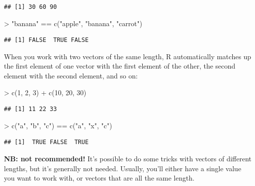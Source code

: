 \documentclass[
]{book}
\newenvironment{Shaded}{\begin{snugshade}}{\end{snugshade}}
\newcommand{\DecValTok}[1]{\textcolor[rgb]{0.00,0.00,0.81}{#1}}
\newcommand{\FunctionTok}[1]{\textcolor[rgb]{0.00,0.00,0.00}{#1}}
\newcommand{\NormalTok}[1]{#1}
\newcommand{\SpecialCharTok}[1]{\textcolor[rgb]{0.00,0.00,0.00}{#1}}
\newcommand{\StringTok}[1]{\textcolor[rgb]{0.31,0.60,0.02}{#1}}
\begin{document}
\begin{verbatim}
## [1] 30 60 90
\end{verbatim}

\begin{Shaded}
\begin{Highlighting}[]
\SpecialCharTok{\textgreater{}} \StringTok{"banana"} \SpecialCharTok{==} \FunctionTok{c}\NormalTok{(}\StringTok{"apple"}\NormalTok{, }\StringTok{"banana"}\NormalTok{, }\StringTok{"carrot"}\NormalTok{)}
\end{Highlighting}
\end{Shaded}

\begin{verbatim}
## [1] FALSE  TRUE FALSE
\end{verbatim}

When you work with two vectors of the same length, R automatically
matches up the first element of one vector with the first element
of the other, the second element with the second element, and so on:

\begin{Shaded}
\begin{Highlighting}[]
\SpecialCharTok{\textgreater{}} \FunctionTok{c}\NormalTok{(}\DecValTok{1}\NormalTok{, }\DecValTok{2}\NormalTok{, }\DecValTok{3}\NormalTok{) }\SpecialCharTok{+} \FunctionTok{c}\NormalTok{(}\DecValTok{10}\NormalTok{, }\DecValTok{20}\NormalTok{, }\DecValTok{30}\NormalTok{)}
\end{Highlighting}
\end{Shaded}

\begin{verbatim}
## [1] 11 22 33
\end{verbatim}

\begin{Shaded}
\begin{Highlighting}[]
\SpecialCharTok{\textgreater{}} \FunctionTok{c}\NormalTok{(}\StringTok{"a"}\NormalTok{, }\StringTok{"b"}\NormalTok{, }\StringTok{"c"}\NormalTok{) }\SpecialCharTok{==} \FunctionTok{c}\NormalTok{(}\StringTok{"a"}\NormalTok{, }\StringTok{"x"}\NormalTok{, }\StringTok{"c"}\NormalTok{)}
\end{Highlighting}
\end{Shaded}

\begin{verbatim}
## [1]  TRUE FALSE  TRUE
\end{verbatim}

\textbf{NB: not recommended!} It's possible to do some tricks with
vectors of different lengths, but it's generally not needed. Usually,
you'll either have a single value you want to work with, or vectors
that are all the same length.
\end{document}
